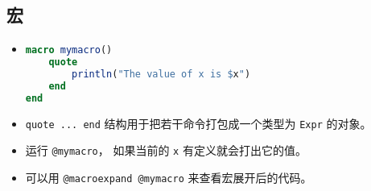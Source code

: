 \subsection{宏}
\begin{itemize}
\item 
\begin{lstlisting}[language=julia]
macro mymacro()
    quote
        println("The value of x is $x")
    end
end
\end{lstlisting}
\item \verb`quote ... end` 结构用于把若干命令打包成一个类型为 \verb`Expr` 的对象。
\item 运行 \verb`@mymacro`， 如果当前的 \verb`x` 有定义就会打出它的值。
\item 可以用 \verb`@macroexpand @mymacro` 来查看宏展开后的代码。
\end{itemize}


